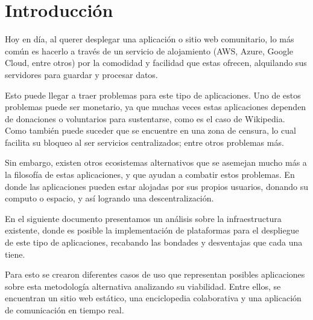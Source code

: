 \section{Introducción}

Hoy en día, al querer desplegar una aplicación o sitio web comunitario, lo más común es hacerlo a través de un servicio de alojamiento (AWS, Azure, Google Cloud, entre otros) por la comodidad y facilidad que estas ofrecen, alquilando sus servidores para guardar y procesar datos.

Esto puede llegar a traer problemas para este tipo de aplicaciones. Uno de estos problemas puede ser monetario, ya que muchas veces estas aplicaciones dependen de donaciones o voluntarios para sustentarse, como es el caso de Wikipedia. Como también puede suceder que se encuentre en una zona de censura, lo cual facilita su bloqueo al ser servicios centralizados; entre otros problemas más.

Sin embargo, existen otros ecosistemas alternativos que se asemejan mucho más a la filosofía de estas aplicaciones, y que ayudan a combatir estos problemas. En donde las aplicaciones pueden estar alojadas por sus propios usuarios, donando su computo o espacio, y así logrando una descentralización.

En el siguiente documento presentamos un análisis sobre la infraestructura existente, donde es posible la implementación de plataformas para el despliegue de este tipo de aplicaciones, recabando las bondades y desventajas que cada una tiene. 

Para esto se crearon diferentes casos de uso que representan posibles aplicaciones sobre esta metodología alternativa analizando su viabilidad. Entre ellos, se encuentran un sitio web estático, una enciclopedia colaborativa y una aplicación de comunicación en tiempo real.